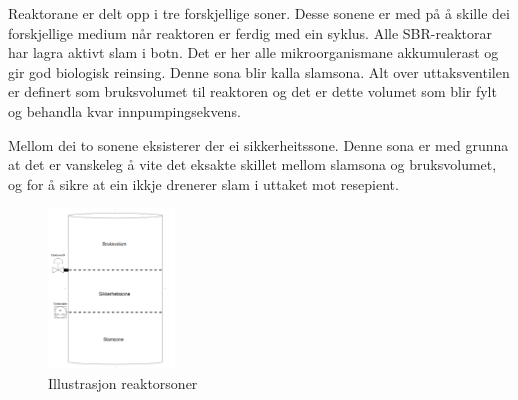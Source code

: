 Reaktorane er delt opp i tre forskjellige soner. Desse sonene er med på å skille
dei forskjellige medium når reaktoren er ferdig med ein syklus.
Alle SBR-reaktorar har lagra aktivt slam i botn. Det er her alle mikroorganismane akkumulerast
og gir god biologisk reinsing. Denne sona blir kalla slamsona.\newline
Alt over uttaksventilen er definert som bruksvolumet til reaktoren og det
er dette volumet som blir fylt og behandla kvar innpumpingsekvens.

Mellom dei to sonene eksisterer der ei sikkerheitssone. Denne sona er med grunna
at det er vanskeleg å vite det eksakte skillet mellom slamsona og bruksvolumet, 
og for å sikre at ein ikkje drenerer slam i uttaket mot resepient.

\begin{figure}[htbp]
    \centering
    \includegraphics[width=0.3\textwidth]{Figurar/Reaktorsoner.png}
    \caption{Illustrasjon reaktorsoner}\label{fig:reaktorsoner}
\end{figure}